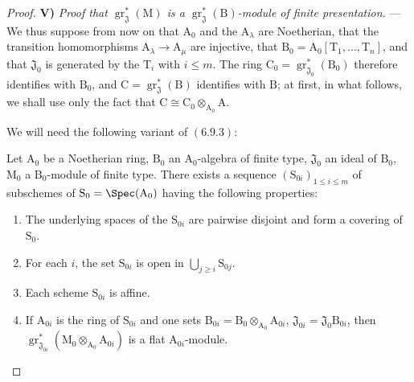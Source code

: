 \begin{proof}
\medskip
\noindent\textbf{V)} \emph{Proof that $\operatorname{gr}^*_\mathfrak{J}(\mathrm{M})$ is a $\operatorname{gr}^*_\mathfrak{J}(\mathrm{B})$-module of finite presentation.} --- We thus suppose from now on that $\mathrm{A}_0$ and the $\mathrm{A}_\lambda$ are Noetherian, that the transition homomorphisms $\mathrm{A}_\lambda\to\mathrm{A}_\mu$ are injective, that $\mathrm{B}_0=\mathrm{A}_0[\mathrm{T}_1,\ldots,\mathrm{T}_n]$, and that $\mathfrak{J}_0$ is generated by the $\mathrm{T}_i$ with $i\leqslant m$. The ring $\mathrm{C}_0=\operatorname{gr}^*_{\mathfrak{J}_0}(\mathrm{B}_0)$ therefore identifies with $\mathrm{B}_0$, and $\mathrm{C}=\operatorname{gr}^*_\mathfrak{J}(\mathrm{B})$ identifies with $\mathrm{B}$; at first, in what follows, we shall use only the fact that $\mathrm{C}\cong\mathrm{C}_0\otimes_{\mathrm{A}_0}\mathrm{A}$.

We will need the following variant of $(6.9.3)$:

\begin{lemma}[11.2.9.5]
\label{IV.11.2.9.5}
Let $\mathrm{A}_0$ be a Noetherian ring, $\mathrm{B}_0$ an
$\mathrm{A}_0$-algebra of finite type, $\mathfrak{J}_0$ an ideal of
$\mathrm{B}_0$, $\mathrm{M}_0$ a $\mathrm{B}_0$-module of finite type. There
exists a sequence $(\mathrm{S}_{0i})_{1\leqslant i\leqslant m}$ of
subschemes of $\mathrm{S}_0=\Spec(\mathrm{A}_0)$ having the following
properties:
\begin{enumerate}[label=\arabic{enumi}\textsuperscript{o}]
  \item The underlying spaces of the $\mathrm{S}_{0i}$ are pairwise disjoint and form a covering of $\mathrm{S}_0$.
  \item For each $i$, the set $\mathrm{S}_{0i}$ is open in $\bigcup_{j\geqslant i}\mathrm{S}_{0j}$.
  \item Each scheme $\mathrm{S}_{0i}$ is affine.
  \item If $\mathrm{A}_{0i}$ is the ring of $\mathrm{S}_{0i}$ and one sets $\mathrm{B}_{0i}=\mathrm{B}_0\otimes_{\mathrm{A}_0}\mathrm{A}_{0i}$, $\mathfrak{J}_{0i}=\mathfrak{J}_0\mathrm{B}_{0i}$, then $\operatorname{gr}^*_{\mathfrak{J}_{0i}}(\mathrm{M}_0\otimes_{\mathrm{A}_0}\mathrm{A}_{0i})$ is a flat $\mathrm{A}_{0i}$-module.
\end{enumerate}
\end{lemma}


\end{proof}
